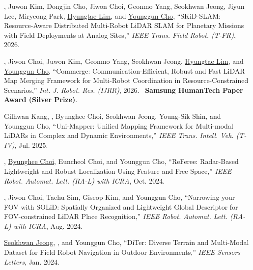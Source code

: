 \begin{pubSubsectionNum}
    \item \hogyunkim, Juwon Kim, Dongjin Cho, Jiwon Choi, Geonmo Yang, Seokhwan Jeong, Jiyun Lee, Miryeong Park, \underline{Hyungtae Lim}, and \underline{Younggun Cho}, ``SKiD-SLAM: Resource-Aware Distributed Multi-Robot LiDAR SLAM for Planetary Missions with Field Deployments at Analog Sites,'' \textit{IEEE Trans. Field Robot. (T-FR)}, 2026. \accepted
    \item \hogyunkim, Jiwon Choi, Juwon Kim, Geonmo Yang, Seokhwan Jeong, \underline{Hyungtae Lim}, and \underline{Younggun Cho}, ``Commerge: Communication-Efficient, Robust and Fast LiDAR Map Merging Framework for Multi-Robot Coordination in Resource-Constrained Scenarios,'' \textit{Int. J. Robot. Res. (IJRR)}, 2026. \accepted~\textbf{Samsung HumanTech Paper Award (Silver Prize)}.
    \item Gilhwan Kang, \hogyunkim, Byunghee Choi, Seokhwan Jeong, Young-Sik Shin, and Younggun Cho, ``Uni-Mapper: Unified Mapping Framework for Multi-modal LiDARs in Complex and Dynamic Environments,'' \textit{IEEE Trans. Intell. Veh. (T-IV)}, Jul. 2025.
    \item \underline{\hogyunkim}, \underline{Byunghee Choi}, Euncheol Choi, and Younggun Cho, ``ReFeree: Radar-Based Lightweight and Robust Localization Using Feature and Free Space,'' \textit{IEEE Robot. Automat. Lett. (RA-L) with ICRA}, Oct. 2024.
    \item \hogyunkim, Jiwon Choi, Taehu Sim, Giseop Kim, and Younggun Cho, ``Narrowing your FOV with SOLiD: Spatially Organized and Lightweight Global Descriptor for FOV-constrained LiDAR Place Recognition,'' \textit{IEEE Robot. Automat. Lett. (RA-L) with ICRA}, Aug. 2024.
    \item \underline{Seokhwan Jeong}, \underline{\hogyunkim}, and Younggun Cho, ``DiTer: Diverse Terrain and Multi-Modal Dataset for Field Robot Navigation in Outdoor Environments,'' \textit{IEEE Sensors Letters}, Jan. 2024.
\end{pubSubsectionNum}
